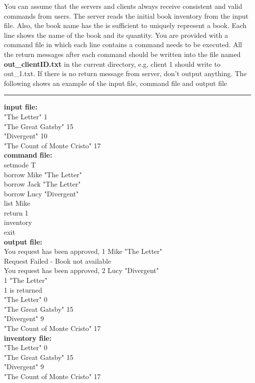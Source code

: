 \documentclass[letter, 11pt] {article}
\begin{document}
\begin{enumerate}
  You can assume that the servers and clients always receive consistent and
  valid commands from users. The server reads the initial book inventory from the input file. 
  Also, the book name has the is sufficient to uniquely represent a book. 
  Each line shows the name of the book and its quantity. You are provided with a command file in which each line contains a command needs to be executed. All the return messages after each command should be written into the file named \textbf{out\_clientID.txt} in the current directory, e.g, client 1 should write to out\_1.txt. If there is no return message from server, don't output anything. The following shows an example of the input file, command file and output file\\
\hrule
  {\bf input file:} \\
  "The Letter" 1 \\
  "The Great Gatsby" 15 \\
  "Divergent" 10 \\
  "The Count of Monte Cristo" 17 \\
  
   {\bf command file:} \\
  setmode T\\
  borrow Mike "The Letter"\\
  borrow Jack "The Letter"\\
  borrow Lucy "Divergent"\\
  list Mike\\
  return 1 \\
  inventory   \\
  exit \\
  
  {\bf output file:} \\
  You request has been approved, 1 Mike "The Letter"\\
  Request Failed - Book not available \\ 
  You request has been approved, 2 Lucy "Divergent"\\
  1 "The Letter"\\
  1 is returned\\
  "The Letter" 0 \\
  "The Great Gatsby" 15 \\
  "Divergent" 9 \\
  "The Count of Monte Cristo" 17 \\
  
  {\bf inventory file:} \\
  "The Letter" 0 \\
  "The Great Gatsby" 15 \\
  "Divergent" 9 \\
  "The Count of Monte Cristo" 17 \\
  

\end{enumerate}
\end{document}
